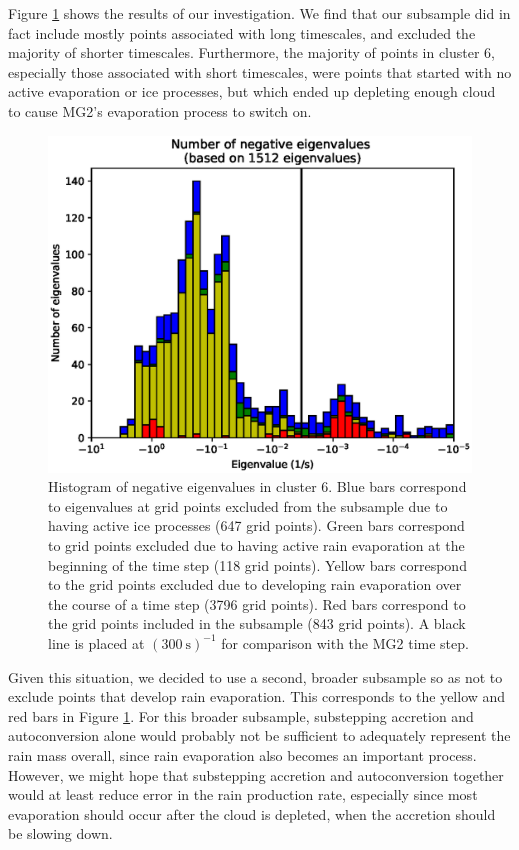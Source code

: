 \documentclass [11pt, proquest] {uwthesis}[2020/02/24]
\begin{document}
Figure \ref{eig-c6-subsample} shows the results of our investigation. We find that our subsample did in fact include mostly points associated with long timescales, and excluded the majority of shorter timescales. Furthermore, the majority of points in cluster 6, especially those associated with short timescales, were points that started with no active evaporation or ice processes, but which ended up depleting enough cloud to cause MG2's evaporation process to switch on.

\begin{figure}[ht]
  \includegraphics[width=6.5in]{./time_hist_all_values_neg_c6_subsample.eps}
  \caption{Histogram of negative eigenvalues in cluster 6. Blue bars correspond to eigenvalues at grid points excluded from the subsample due to having active ice processes (\num{647} grid points). Green bars correspond to grid points excluded due to having active rain evaporation at the beginning of the time step (\num{118} grid points). Yellow bars correspond to the grid points excluded due to developing rain evaporation over the course of a time step (\num{3796} grid points). Red bars correspond to the grid points included in the subsample (\num{843} grid points). A black line is placed at $(\SI{300}{\second})^{-1}$ for comparison with the MG2 time step.}
  \label{eig-c6-subsample}
\end{figure}

Given this situation, we decided to use a second, broader subsample so as not to exclude points that develop rain evaporation. This corresponds to the yellow and red bars in Figure \ref{eig-c6-subsample}. For this broader subsample, substepping accretion and autoconversion alone would probably not be sufficient to adequately represent the rain mass overall, since rain evaporation also becomes an important process. However, we might hope that substepping accretion and autoconversion together would at least reduce error in the rain production rate, especially since most evaporation should occur after the cloud is depleted, when the accretion should be slowing down.
\end{document}

